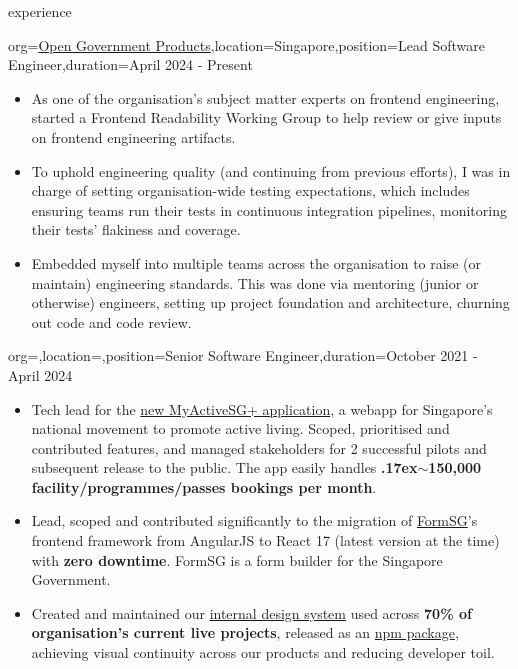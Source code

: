 \documentclass{resume}
\newcommand{\mytilde}{\raise.17ex\hbox{$\scriptstyle\mathtt{\sim}$}}
\begin{document}
\makeheader

\begin{ResumeSection}{experience}
    \begin{ResumeSubsection}{org=\href{https://open.gov.sg}{Open Government Products},location={Singapore},position={Lead Software Engineer},duration=April 2024 - Present}
        \begin{itemize} 
            \item As one of the organisation's subject matter experts on frontend engineering, started a Frontend Readability Working Group to help review or give inputs on frontend engineering artifacts. 
            \item To uphold engineering quality (and continuing from previous efforts), I was in charge of setting organisation-wide testing expectations, which includes ensuring teams run their tests in continuous integration pipelines, monitoring their tests' flakiness and coverage.
            \item Embedded myself into multiple teams across the organisation to raise (or maintain) engineering standards. This was done via mentoring (junior or otherwise) engineers, setting up project foundation and architecture, churning out code and code review.
        \end{itemize}
        \medskip
    \end{ResumeSubsection}
    \begin{ResumeSubsection}{org=,location=,position={Senior Software Engineer},duration=October 2021 - April 2024}
        \begin{itemize}
            \item Tech lead for the \href{https://activesg.gov.sg/}{new MyActiveSG+ application}, a webapp for Singapore's national movement to promote active living. Scoped, prioritised and contributed features, and managed stakeholders for 2 successful pilots and subsequent release to the public. The app easily handles \textbf{\mytilde150,000 facility/programmes/passes bookings per month}.
            \item Lead, scoped and contributed significantly to the migration of \href{https://github.com/opengovsg/FormSG}{FormSG}'s frontend framework from AngularJS to React 17 (latest version at the time) with \textbf{zero downtime}. FormSG is a form builder for the Singapore Government.
            \item Created and maintained our \href{https://design.open.gov.sg/}{internal design system} used across \textbf{70\% of organisation's current live projects}, released as an \href{https://www.npmjs.com/package/@opengovsg/design-system-react}{npm package}, achieving visual continuity across our products and reducing developer toil.

\end{itemize}
\end{ResumeSubsection}
\end{ResumeSection}
\end{document}

